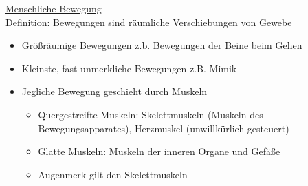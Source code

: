 \documentclass[a4paper,10pt,oneside]{article}
\begin{document}
\underline{Menschliche Bewegung} \\
Definition: Bewegungen sind räumliche Verschiebungen von Gewebe
	\begin{itemize}
		\item Größräumige Bewegungen z.b. Bewegungen der Beine beim Gehen
		\item Kleinste, fast unmerkliche Bewegungen z.B. Mimik
		\item Jegliche Bewegung geschieht durch Muskeln
			\begin{itemize}
				\item Quergestreifte Muskeln: Skelettmuskeln (Muskeln des Bewegungsapparates), Herzmuskel (unwillkürlich gesteuert)
				\item Glatte Muskeln: Muskeln der inneren Organe und Gefäße
				\item Augenmerk gilt den Skelettmuskeln
			\end{itemize}
	\end{itemize}
\end{document}
